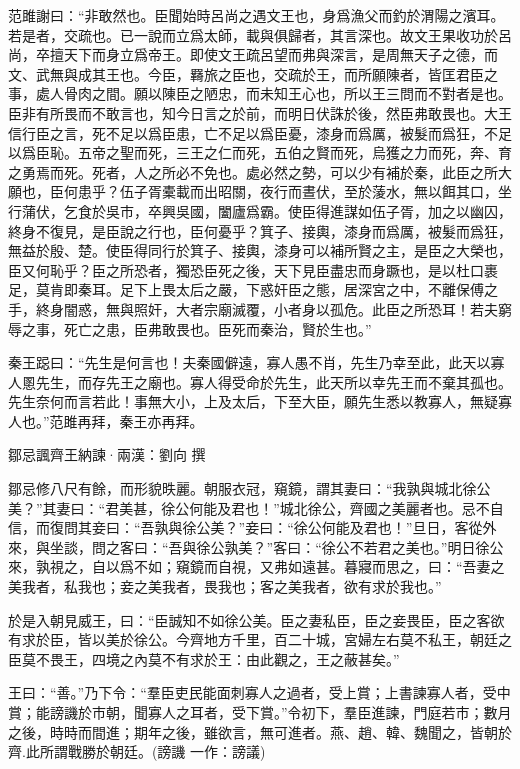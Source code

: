 \documentclass[12pt,a4paper]{ctexbook}
\begin{document}
范雎謝曰：“非敢然也。臣聞始時呂尚之遇文王也，身爲漁父而釣於渭陽之濱耳。若是者，交疏也。已一說而立爲太師，載與俱歸者，其言深也。故文王果收功於呂尚，卒擅天下而身立爲帝王。即使文王疏呂望而弗與深言，是周無天子之德，而文、武無與成其王也。今臣，羇旅之臣也，交疏於王，而所願陳者，皆匡君臣之事，處人骨肉之間。願以陳臣之陋忠，而未知王心也，所以王三問而不對者是也。臣非有所畏而不敢言也，知今日言之於前，而明日伏誅於後，然臣弗敢畏也。大王信行臣之言，死不足以爲臣患，亡不足以爲臣憂，漆身而爲厲，被髮而爲狂，不足以爲臣恥。五帝之聖而死，三王之仁而死，五伯之賢而死，烏獲之力而死，奔、育之勇焉而死。死者，人之所必不免也。處必然之勢，可以少有補於秦，此臣之所大願也，臣何患乎？伍子胥橐載而出昭關，夜行而晝伏，至於蔆水，無以餌其口，坐行蒲伏，乞食於吳市，卒興吳國，闔廬爲霸。使臣得進謀如伍子胥，加之以幽囚，終身不復見，是臣說之行也，臣何憂乎？箕子、接輿，漆身而爲厲，被髮而爲狂，無益於殷、楚。使臣得同行於箕子、接輿，漆身可以補所賢之主，是臣之大榮也，臣又何恥乎？臣之所恐者，獨恐臣死之後，天下見臣盡忠而身蹶也，是以杜口裹足，莫肯即秦耳。足下上畏太后之嚴，下惑奸臣之態，居深宮之中，不離保傅之手，終身闇惑，無與照奸，大者宗廟滅覆，小者身以孤危。此臣之所恐耳！若夫窮辱之事，死亡之患，臣弗敢畏也。臣死而秦治，賢於生也。”\par
秦王跽曰：“先生是何言也！夫秦國僻遠，寡人愚不肖，先生乃幸至此，此天以寡人慁先生，而存先王之廟也。寡人得受命於先生，此天所以幸先王而不棄其孤也。先生奈何而言若此！事無大小，上及太后，下至大臣，願先生悉以教寡人，無疑寡人也。”范雎再拜，秦王亦再拜。\par
鄒忌諷齊王納諫·兩漢：劉向 撰 \par
鄒忌修八尺有餘，而形貌昳麗。朝服衣冠，窺鏡，謂其妻曰：“我孰與城北徐公美？”其妻曰：“君美甚，徐公何能及君也！”城北徐公，齊國之美麗者也。忌不自信，而復問其妾曰：“吾孰與徐公美？”妾曰：“徐公何能及君也！”旦日，客從外來，與坐談，問之客曰：“吾與徐公孰美？”客曰：“徐公不若君之美也。”明日徐公來，孰視之，自以爲不如；窺鏡而自視，又弗如遠甚。暮寢而思之，曰：“吾妻之美我者，私我也；妾之美我者，畏我也；客之美我者，欲有求於我也。”\par
於是入朝見威王，曰：“臣誠知不如徐公美。臣之妻私臣，臣之妾畏臣，臣之客欲有求於臣，皆以美於徐公。今齊地方千里，百二十城，宮婦左右莫不私王，朝廷之臣莫不畏王，四境之內莫不有求於王：由此觀之，王之蔽甚矣。”\par
王曰：“善。”乃下令：“羣臣吏民能面刺寡人之過者，受上賞；上書諫寡人者，受中賞；能謗譏於市朝，聞寡人之耳者，受下賞。”令初下，羣臣進諫，門庭若市；數月之後，時時而間進；期年之後，雖欲言，無可進者。燕、趙、韓、魏聞之，皆朝於齊.此所謂戰勝於朝廷。(謗譏 一作：謗議)\par
\end{document}
